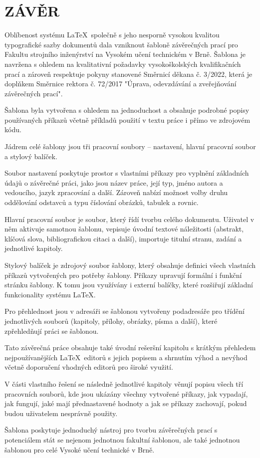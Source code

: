 
\chapter*{ZÁVĚR}
{}

Oblíbenost systému \LaTeX\ společně s jeho nesporně vysokou kvalitou typografické sazby dokumentů dala vzniknout šabloně závěrečných prací pro Fakultu strojního inženýrství na Vysokém učení technickém v Brně. Šablona je navržena s ohledem na kvalitativní požadavky vysokoškolských kvalifikačních prací a zároveň respektuje pokyny stanovené Směrnicí děkana č. 3/2022, která je doplňkem Směrnice rektora č. 72/2017 "Úprava, odevzdávání a zveřejňování závěrečných prací".

Šablona byla vytvořena s ohledem na jednoduchost a obsahuje podrobné popisy používaných příkazů včetně příkladů použití v textu práce i přímo ve zdrojovém kódu.

Jádrem celé šablony jsou tři pracovní soubory -- nastavení, hlavní pracovní soubor a stylový balíček.

Soubor nastavení poskytuje prostor s vlastními příkazy pro vyplnění základních údajů o závěrečné práci, jako jsou název práce, její typ, jméno autora a vedoucího, jazyk zpracování a další. Zároveň nabízí možnost volby druhu oddělování odstavců a typu číslování obrázků, tabulek a rovnic.

Hlavní pracovní soubor je soubor, který řídí tvorbu celého dokumentu. Uživatel v něm aktivuje samotnou šablonu, vepisuje úvodní textové náležitosti (abstrakt, klíčová slova, bibliografickou citaci a další), importuje titulní stranu, zadání a jednotlivé kapitoly.

Stylový balíček je zdrojový soubor šablony, který obsahuje definici všech vlastních příkazů vytvořených pro potřeby šablony. Příkazy upravují formální i funkční stránku šablony. K tomu jsou využívány i externí balíčky, které rozšiřují základní funkcionality systému \LaTeX.

Pro přehlednost jsou v adresáři se šablonou vytvořeny podadresáře pro třídění jednotlivých souborů (kapitoly, přílohy, obrázky, písma a další), které zpřehledňují práci se šablonou.

Tato závěrečná práce obsahuje také úvodní rešeršní kapitolu s krátkým přehledem nejpoužívanějších \LaTeX\ editorů s jejich popisem a shrnutím výhod a nevýhod včetně doporučení vhodných editorů pro široké využití.

V části vlastního řešení se následně jednotlivé kapitoly věnují popisu všech tří pracovních souborů, kde jsou ukázány všechny vytvořené příkazy, jak vypadají, jak fungují, jaké mají přednastavené hodnoty a jak se příkazy zachovají, pokud budou uživatelem nesprávně použity.

Šablona poskytuje jednoduchý nástroj pro tvorbu závěrečných prací s potenciálem stát se nejenom jednotnou fakultní šablonou, ale také jednotnou šablonou pro celé Vysoké učení technické v Brně.

